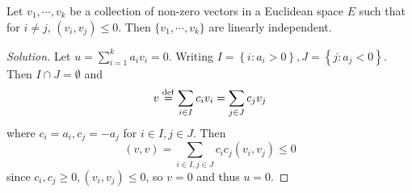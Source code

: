 \documentclass{report}
\begin{document}
\begin{exercise}[Exercise 7.3]
    Let $v_1, \cdots, v_k$ be a collection of non-zero vectors in a Euclidean space $E$ such that for $i \neq j$, $(v_i, v_j) \leq 0$.
    Then $\{v_1, \cdots, v_k\}$ are linearly independent.
\end{exercise}
\begin{proof}[Solution]
    Let $u = \sum_{i=1}^k a_i v_i = 0$.
    Writing $I = \left\{ i: a_i > 0 \right\}, J = \left\{ j: a_j < 0 \right\}$.
    Then $I \cap J = \emptyset$ and
    \[
    v \overset{\mathrm{def}}{=} \sum_{i \in I} c_i v_i = \sum_{j \in J} c_j v_j
    \]
    where $c_i = a_i, c_j = -a_j$ for $i \in I, j \in J$.
    Then
    \[
    (v,v) = \sum_{i \in I, j \in J} c_i c_j (v_i, v_j) \leq 0
    \]
    since $c_i, c_j \geq 0, (v_i, v_j) \leq 0$, so $v = 0$ and thus $u = 0$.
\end{proof}
\end{document}

